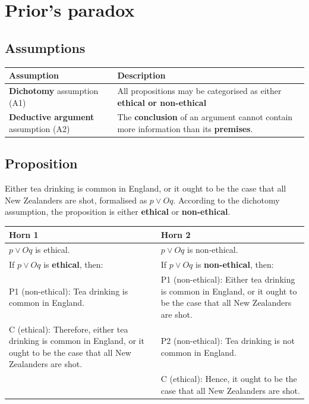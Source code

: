 \documentclass[11pt]{article}
\begin{document}
 \newpage
\section{Prior's paradox}
\label{sec:org593cd44}

\subsection{Assumptions}
\label{sec:org3f3eb69}
\begin{center}
\begin{tabular}{|m{5em}|m{25em}|}
\hline
Assumption & Description\\
\hline
\textbf{Dichotomy} assumption (A1) & All propositions may be categorised as either \textbf{ethical or non-ethical}\\
\hline
\textbf{Deductive argument} assumption (A2) & The \textbf{conclusion} of an argument cannot contain more information than its \textbf{premises}.\\
\hline
\end{tabular}
\end{center}
\subsection{Proposition}
\label{sec:org7360748}
Either tea drinking is common in England, or it ought to be the case that all New Zealanders are shot, formalised as \(p \vee Oq\). According to the dichotomy assumption, the proposition is either \textbf{ethical} or \textbf{non-ethical}.

\begin{center}
\begin{tabularx}{\textwidth}{|X|X|}
\hline
Horn 1 & Horn 2\\
\hline
\(p \vee Oq\) is ethical. & \(p \vee Oq\) is non-ethical.\\
\hline
If \(p \vee Oq\) is \textbf{ethical}, then: & If \(p \vee Oq\) is \textbf{non-ethical}, then:\\
P1 (non-ethical): Tea drinking is common in England. & P1 (non-ethical): Either tea drinking is common in England, or it ought to be the case that all New Zealanders are shot.\\
C (ethical): Therefore, either tea drinking is common in England, or it ought to be the case that all New Zealanders are shot. & P2 (non-ethical): Tea drinking is not common in England.\\
 & C (ethical): Hence, it ought to be the case that all New Zealanders are shot.\\
\hline
\end{tabularx}
\end{center}
 \newpage
\end{document}
